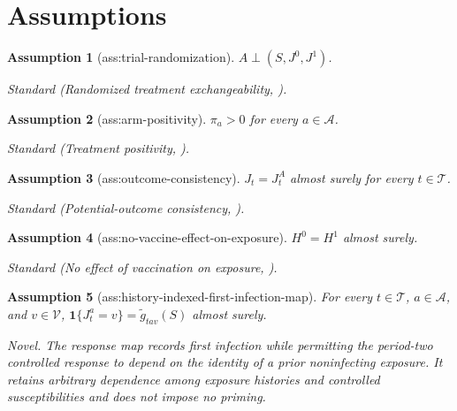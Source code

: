 \documentclass{article}
\newtheorem{assumption}{Assumption}
\begin{document}
\section{Assumptions}

\begin{assumption}[ass:trial-randomization]\label{ass:trial-randomization}
\(A\perp(S,J^0,J^1)\).
\par\smallskip\noindent\emph{Standard} (Randomized treatment exchangeability, \cite{janvin_stensrud_2025_challenge}).
\end{assumption}

\begin{assumption}[ass:arm-positivity]\label{ass:arm-positivity}
\(\pi_a>0\) for every \(a\in\mathcal A\).
\par\smallskip\noindent\emph{Standard} (Treatment positivity, \cite{janvin_stensrud_2025_challenge}).
\end{assumption}

\begin{assumption}[ass:outcome-consistency]\label{ass:outcome-consistency}
\(J_t=J_t^A\) almost surely for every \(t\in\mathcal T\).
\par\smallskip\noindent\emph{Standard} (Potential-outcome consistency, \cite{janvin_stensrud_2025_challenge}).
\end{assumption}

\begin{assumption}[ass:no-vaccine-effect-on-exposure]\label{ass:no-vaccine-effect-on-exposure}
\(H^0=H^1\) almost surely.
\par\smallskip\noindent\emph{Standard} (No effect of vaccination on exposure, \cite{janvin_stensrud_2025_challenge}).
\end{assumption}

\begin{assumption}[ass:history-indexed-first-infection-map]\label{ass:history-indexed-first-infection-map}
For every \(t\in\mathcal T\), \(a\in\mathcal A\), and \(v\in\mathcal V\), \(\mathbf 1\{J_t^a=v\}=\widetilde g_{tav}(S)\) almost surely.
\par\smallskip\noindent\emph{Novel.} The response map records first infection while permitting the period-two controlled response to depend on the identity of a prior noninfecting exposure. It retains arbitrary dependence among exposure histories and controlled susceptibilities and does not impose no priming.
\end{assumption}
\end{document}
